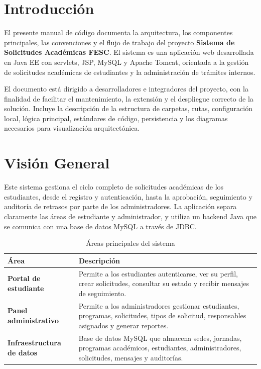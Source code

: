 \documentclass[12pt,letterpaper]{article}
\begin{document}
\newpage
{}
\listoffigures

\section*{Introducción}

El presente manual de código documenta la arquitectura, los componentes principales, las convenciones y el flujo de trabajo del proyecto \textbf{Sistema de Solicitudes Académicas FESC}. El sistema es una aplicación web desarrollada en Java EE con servlets, JSP, MySQL y Apache Tomcat, orientada a la gestión de solicitudes académicas de estudiantes y la administración de trámites internos.

El documento está dirigido a desarrolladores e integradores del proyecto, con la finalidad de facilitar el mantenimiento, la extensión y el despliegue correcto de la solución. Incluye la descripción de la estructura de carpetas, rutas, configuración local, lógica principal, estándares de código, persistencia y los diagramas necesarios para visualización arquitectónica.

\section{Visión General}

Este sistema gestiona el ciclo completo de solicitudes académicas de los estudiantes, desde el registro y autenticación, hasta la aprobación, seguimiento y auditoría de retrasos por parte de los administradores. La aplicación separa claramente las áreas de estudiante y administrador, y utiliza un backend Java que se comunica con una base de datos MySQL a través de JDBC.

\begin{longtable}{|>{\bfseries}p{}|p{}|}
\caption{Áreas principales del sistema}\\
\hline
Área & Descripción \\
\hline
Portal de estudiante & Permite a los estudiantes autenticarse, ver su perfil, crear solicitudes, consultar su estado y recibir mensajes de seguimiento. \\
\hline
Panel administrativo & Permite a los administradores gestionar estudiantes, programas, solicitudes, tipos de solicitud, responsables asignados y generar reportes. \\
\hline
Infraestructura de datos & Base de datos MySQL que almacena sedes, jornadas, programas académicos, estudiantes, administradores, solicitudes, mensajes y auditorías. \\
\hline
\end{longtable}
\end{document}
